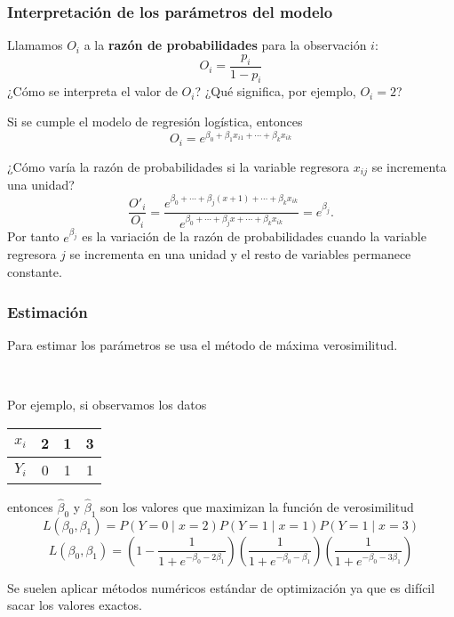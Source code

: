 \documentclass{beamer}
\begin{document}
\begin{frame}[plain]
\frametitle{Interpretación de los parámetros del modelo}

Llamamos $O_i$ a la \textbf{razón de probabilidades} para la observación $i$:
\[
 O_i=\frac{p_i}{1-p_i} 
\]
¿Cómo se interpreta el valor de $O_i$? ¿Qué significa, por ejemplo, $O_i=2$?




Si se cumple el modelo de regresión logística, entonces
\[
O_i =  e^{\beta_0  + \beta_1x_{i1} + \cdots + \beta_kx_{ik}}
\]


¿Cómo varía la razón de probabilidades si la variable regresora $x_{ij}$ se incrementa una unidad?
\[
\frac{O'_i}{O_i} = \frac{e^{\beta_0+\cdots+\beta_j(x+1)+\cdots+\beta_kx_{ik}}}{e^{\beta_0+\cdots+\beta_jx+\cdots+\beta_kx_{ik}}}= e^{\beta_j}.
\]  
Por tanto $e^{\beta_j}$ es la variación de la razón de probabilidades cuando la variable regresora $j$ se incrementa en una unidad y el resto de variables permanece constante. 


\end{frame}
\begin{frame}[plain]
\frametitle{Estimación}

Para estimar los parámetros se usa el método de máxima verosimilitud.

\

Por ejemplo, si observamos los datos

\begin{center}
\begin{tabular}{c|ccc}
$x_i$ & 2 & 1 & 3 \\  \hline
$Y_i$ & 0 & 1 & 1
\end{tabular}
\end{center}

entonces $\hat{\beta}_0$ y $\hat{\beta}_1$ son los valores que maximizan la función de verosimilitud
\[
L(\beta_0,\beta_1) = P(Y=0 \mid x = 2)P(Y=1 \mid x = 1)P(Y=1 \mid x = 3)
\]
\[
L(\beta_0,\beta_1) = \left(1-\frac{1}{1+e^{-\beta_0-2\beta_1}}\right)
\left(\frac{1}{1+e^{-\beta_0-\beta_1}}\right)
\left(\frac{1}{1+e^{-\beta_0-3\beta_1}}\right)
\]


Se suelen aplicar métodos numéricos estándar de optimización ya que es difícil sacar los valores exactos.

\end{frame}
\end{document}

